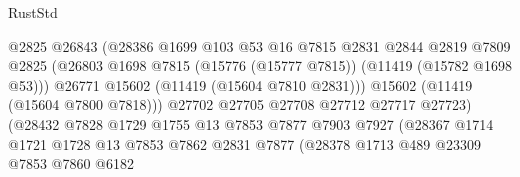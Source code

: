 \begin{lexlean}{RustStd}
\begin{coremodule}
                                        @2825
                                        @26843
                                        (@28386
                                          @1699
                                          @103
                                          @53
                                          @16
                                          @7815
                                          @2831
                                          @2844
                                          @2819
                                          @7809
                                          @2825
                                          (@26803
                                            @1698
                                            @7815
                                            (@15776 (@15777 @7815))
                                            (@11419 (@15782 @1698 @53)))
                                          @26771
                                          @15602
                                          (@11419 (@15604 @7810 @2831)))
                                        @15602
                                        (@11419 (@15604 @7800 @7818)))
                                      @27702
                                      @27705
                                      @27708
                                      @27712
                                      @27717
                                      @27723)
                                    (@28432
                                      @7828
                                      @1729
                                      @1755
                                      @13
                                      @7853
                                      @7877
                                      @7903
                                      @7927
                                      (@28367
                                        @1714
                                        @1721
                                        @1728
                                        @13
                                        @7853
                                        @7862
                                        @2831
                                        @7877
                                        (@28378
                                          @1713
                                          @489
                                          @23309
                                          @7853
                                          @7860
                                          @6182

\end{coremodule}
\end{lexlean}
